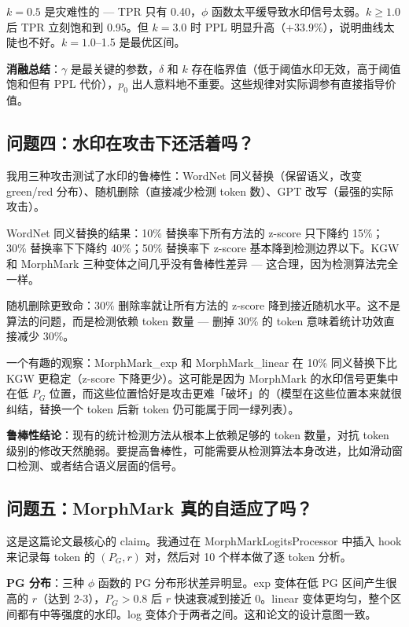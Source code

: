 \documentclass[11pt,a4paper]{article}
\begin{document}
$k=0.5$ 是灾难性的 — TPR 只有 0.40，$\phi$ 函数太平缓导致水印信号太弱。$k \ge 1.0$ 后 TPR 立刻饱和到 0.95。但 $k=3.0$ 时 PPL 明显升高（+33.9\%），说明曲线太陡也不好。$k=1.0$--1.5 是最优区间。

\textbf{消融总结}：$\gamma$ 是最关键的参数，$\delta$ 和 $k$ 存在临界值（低于阈值水印无效，高于阈值饱和但有 PPL 代价），$p_0$ 出人意料地不重要。这些规律对实际调参有直接指导价值。

\subsection{问题四：水印在攻击下还活着吗？}

我用三种攻击测试了水印的鲁棒性：WordNet 同义替换（保留语义，改变 green/red 分布）、随机删除（直接减少检测 token 数）、GPT 改写（最强的实际攻击）。

WordNet 同义替换的结果：10\% 替换率下所有方法的 z-score 只下降约 15\%；30\% 替换率下下降约 40\%；50\% 替换率下 z-score 基本降到检测边界以下。KGW 和 MorphMark 三种变体之间几乎没有鲁棒性差异 — 这合理，因为检测算法完全一样。

随机删除更致命：30\% 删除率就让所有方法的 z-score 降到接近随机水平。这不是算法的问题，而是检测依赖 token 数量 — 删掉 30\% 的 token 意味着统计功效直接减少 30\%。

一个有趣的观察：MorphMark\_exp 和 MorphMark\_linear 在 10\% 同义替换下比 KGW 更稳定（z-score 下降更少）。这可能是因为 MorphMark 的水印信号更集中在低 $P_G$ 位置，而这些位置恰好是攻击更难「破坏」的（模型在这些位置本来就很纠结，替换一个 token 后新 token 仍可能属于同一绿列表）。

\textbf{鲁棒性结论}：现有的统计检测方法从根本上依赖足够的 token 数量，对抗 token 级别的修改天然脆弱。要提高鲁棒性，可能需要从检测算法本身改进，比如滑动窗口检测、或者结合语义层面的信号。

\subsection{问题五：MorphMark 真的自适应了吗？}

这是这篇论文最核心的 claim。我通过在 MorphMarkLogitsProcessor 中插入 hook 来记录每 token 的 $(P_G, r)$ 对，然后对 10 个样本做了逐 token 分析。

\textbf{PG 分布}：三种 $\phi$ 函数的 PG 分布形状差异明显。exp 变体在低 PG 区间产生很高的 $r$（达到 2-3），$P_G > 0.8$ 后 $r$ 快速衰减到接近 0。linear 变体更均匀，整个区间都有中等强度的水印。log 变体介于两者之间。这和论文的设计意图一致。
\end{document}
